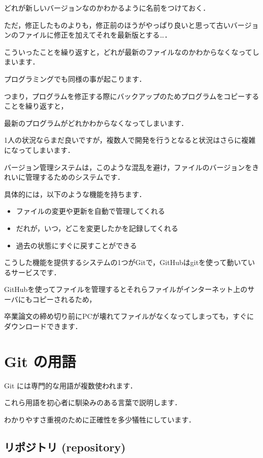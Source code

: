 どれが新しいバージョンなのかわかるように名前をつけておく．

ただ，修正したものよりも，修正前のほうがやっぱり良いと思って古いバージョンのファイルに修正を加えてそれを最新版とする…．

こういったことを繰り返すと，どれが最新のファイルなのかわからなくなってしまいます．


プログラミングでも同様の事が起こります．

つまり，プログラムを修正する際にバックアップのためプログラムをコピーすることを繰り返すと，

最新のプログラムがどれかわからなくなってしまいます．

1人の状況ならまだ良いですが，複数人で開発を行うとなると状況はさらに複雑になってしまいます．


バージョン管理システムは，このような混乱を避け，ファイルのバージョンをきれいに管理するためのシステムです．

具体的には，以下のような機能を持ちます．

\begin{itemize}
\item ファイルの変更や更新を自動で管理してくれる
\item だれが，いつ，どこを変更したかを記録してくれる
\item 過去の状態にすぐに戻すことができる
\end{itemize}


こうした機能を提供するシステムの1つがGitで，GitHubはgitを使って動いているサービスです．

GitHubを使ってファイルを管理するとそれらファイルがインターネット上のサーバにもコピーされるため，

卒業論文の締め切り前にPCが壊れてファイルがなくなってしまっても，すぐにダウンロードできます．


\section{Git の用語}

Git には専門的な用語が複数使われます．

これら用語を初心者に馴染みのある言葉で説明します．

わかりやすさ重視のために正確性を多少犠牲にしています．


\subsection{リポジトリ (repository)}

